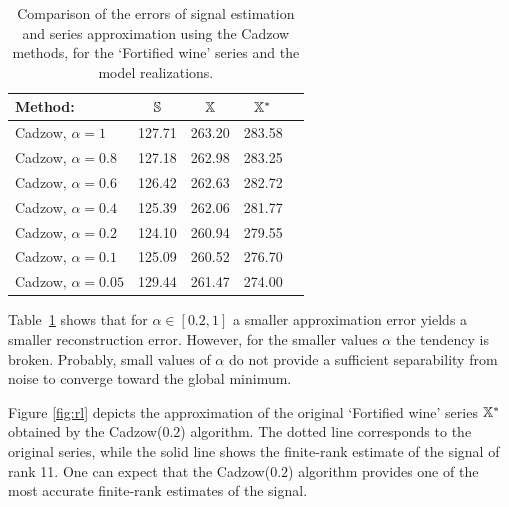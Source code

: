 \documentclass[sii]{ipart}
\begin{document}
\begin{table}
	\caption{Comparison of the errors of signal estimation and series approximation using the Cadzow methods, for the `Fortified wine' series and the model realizations.}
\label{tab:rltable}
	
	\begin{tabular*}{\textwidth}{@{\extracolsep{\fill}}lcccc}
		\hline
		Method: & $\mathbb{S}$ & $\mathbb{X}$ & $\mathbb{X}^*$ \\
		\hline
		Cadzow, $\alpha = 1$ & 127.71 & 263.20 & 283.58 \\
		\hline
		Cadzow, $\alpha = 0.8$ & 127.18 & 262.98 & 283.25 \\
		\hline
		Cadzow, $\alpha = 0.6$ & 126.42 & 262.63 & 282.72 \\
		\hline
		Cadzow, $\alpha = 0.4$ & 125.39 & 262.06 & 281.77 \\
		\hline
		Cadzow, $\alpha = 0.2$ & 124.10 & 260.94 & 279.55 \\
		\hline
		Cadzow, $\alpha = 0.1$ & 125.09 & 260.52 & 276.70 \\
		\hline
		Cadzow, $\alpha = 0.05$ & 129.44 & 261.47 & 274.00 \\
		\hline
	\end{tabular*}
\end{table}

Table~\ref{tab:rltable} shows that for $\alpha\in [0.2,1]$ a smaller approximation error yields a smaller reconstruction error. However, for the smaller values $\alpha$
the tendency is broken. Probably, small values of $\alpha$ do not provide a sufficient separability from noise
to converge toward the global minimum.

Figure \ref{fig:rl} depicts the approximation of the original `Fortified wine' series $\mathbb{X}^*$ obtained by the Cadzow($0.2$) algorithm.
The dotted line corresponds to the original series, while the solid line shows the finite-rank estimate of the signal of rank 11.
One can expect that the Cadzow($0.2$) algorithm provides one of the most accurate finite-rank estimates of the signal.
\end{document}
